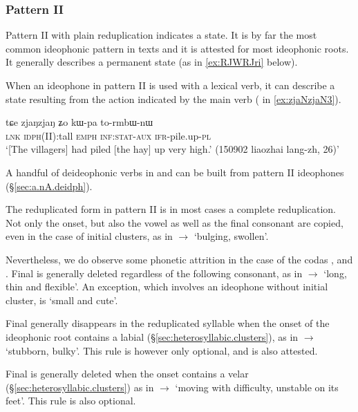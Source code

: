 \subsubsection{Pattern II} \label{sec:ideo.II}
Pattern II with plain reduplication indicates a state. It is by far the most common ideophonic pattern in texts and it is attested for most ideophonic roots.  It generally describes  a permanent state (as in \ref{ex:RJWRJri} below).

When an ideophone in pattern II is used with a lexical verb, it can describe a state resulting from the action indicated by the main verb ( in \ref{ex:zjaNzjaN3}).

  \begin{exe} 
\ex  \label{ex:zjaNzjaN3}
\gll  tɕe zjaŋzjaŋ ʑo kɯ-pa to-rmbɯ-nɯ \\
\textsc{lnk} \textsc{idph}(II):tall \textsc{emph} \textsc{inf}:\textsc{stat}-\textsc{aux} \textsc{ifr}-pile.up-\textsc{pl} \\
 \glt `[The villagers] had piled [the hay] up very high.' (150902 liaozhai lang-zh, 26)'
  \end{exe}
  
A handful of deideophonic verbs in  and  can be built from pattern II ideophones (§\ref{sec:a.nA.deidph}).
 
 The reduplicated form in pattern II is in most cases a complete reduplication. Not only the onset, but also the vowel as well as the final consonant are copied, even in the case of initial clusters, as in  $\rightarrow$  `bulging, swollen'. 

Nevertheless, we do observe some phonetic attrition in the case of  the codas ,  and . Final  is generally deleted regardless of the following consonant, as in   $\rightarrow$  `long, thin and flexible'. An exception, which involves an ideophone without initial cluster, is  `small and cute'.

Final  generally disappears in the reduplicated syllable when the onset of the ideophonic root contains a labial (§\ref{sec:heterosyllabic.clusters}), as in  $\rightarrow$   `stubborn, bulky'. This rule is however only optional, and  is also attested.

Final  is generally deleted when the onset contains a velar (§\ref{sec:heterosyllabic.clusters}) as in  $\rightarrow$  `moving with difficulty, unstable on its feet'. This rule is also optional.

